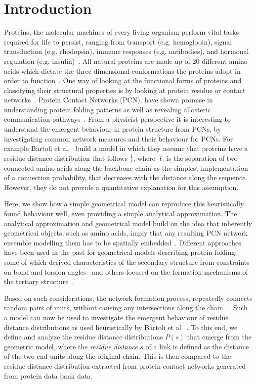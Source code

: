 \documentclass[
reprint,
twocolumn,
amsmath,amssymb,superscriptaddress,aps,
pre]{revtex4-1}
\begin{document}
\section*{Introduction}
Proteins, the molecular machines of every living organism perform vital tasks required for life to persist, ranging from transport (e.g. hemoglobin), signal transduction (e.g. rhodopsin), immune responses (e.g. antibodies), and hormonal regulation (e.g. insulin)~\cite{something}. All natural proteins are made up of 20 different amino acids which dictate the three dimensional conformations the proteins adopt in order to function~\cite{stuff}. One way of looking at the functional forms of proteins and classifying their structural properties is by looking at protein residue or contact networks~\cite{Vendruscolo2002,DiPaola2013,Estrada2011}. Protein Contact Networks (PCN), have shown promise in understanding protein folding patterns as well as revealing allosteric communication pathways~\cite{https://pubs.acs.org/doi/10.1021/acs.jcim.9b00320, and others}. 
From a physicist perspective it is interesting to understand the emergent behaviour in protein structure from PCNs, by investigating common network measures and their behaviour for PCNs. For example Bartoli et al.~\cite{bartoli2008effect} build a model in which they assume that proteins have a residue distance distribution that follows $\frac{1}{\ell}$, where $\ell$ is the separation of two connected amino acids along the backbone chain as the simplest implementation of a connection probability, that decreases with the distance along the sequence. However, they do not provide a quantitative explanation for this assumption. 

Here, we show how a simple geometrical model can reproduce this heuristically found behaviour well, even providing a simple analytical approximation. The analytical approximation and geometrical model build on the idea that inherently geometrical objects, such as amino acids, imply that any resulting PCN network ensemble modelling them has to be spatially embedded~\cite{molkenthin2016scaling, molkenthin2020self}. 
Different approaches have been used in the past for geometrical models describing protein folding, some of which derived characteristics of the secondary structure from constraints on bond and torsion angles~\cite{maybe cite Flory stuff here as well?,Danielsson2010,Molkenthin2011} and others focused on the formation mechanisms of the tertiary structure~\cite{molkenthin2016scaling, molkenthin2020self}. 

Based on such considerations, the network formation process, repeatedly connects random pairs of units, without causing any intersections along the chain ~\cite{molkenthin2016scaling}. Such a model can now be used to investigate the emergent behaviour of residue distance distributions as used heuristically by Bartoli et al.~\cite{bartoli2008effect}. To this end, we define and analyze the residue distance distributions $P(s)$ that emerge from the geometric model, where the \emph{residue distance} $s$ of a link is defined as the distance of the two end units along the original chain.
This is then compared to the residue distance distribution extracted from protein contact networks generated from protein data bank data. 
\end{document}
